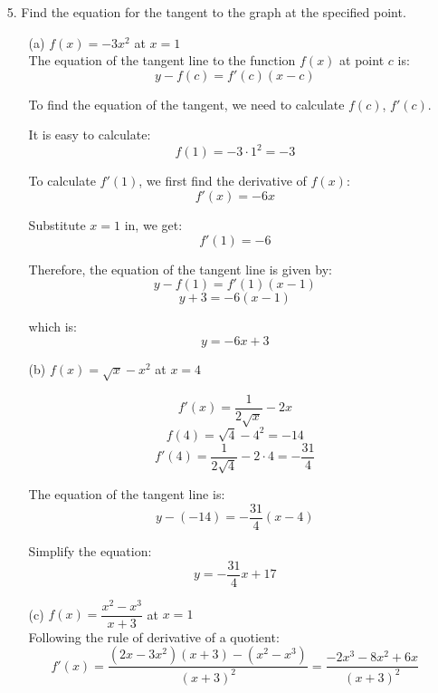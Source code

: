 \documentclass{article}
\begin{document}
\begin{enumerate}

    \item[5.] Find the equation for the tangent to the graph at the specified point.
    
        \begin{enumerate}
            
            \item[(a)] $f(x) = -3x^2$ at $x = 1$ \\
            
            The equation of the tangent line to the function $f(x)$ at point $c$ is: 
            $$ y - f(c) = f'(c)(x - c)$$
                
            To find the equation of the tangent, we need to calculate $f(c)$, $f'(c)$.
            
            It is easy to calculate:
            $$ f(1) = -3 \cdot 1^2 = -3 $$
            
            To calculate $f'(1)$, we first find the derivative of $f(x)$:
            $$ f'(x) = -6x $$
            
            Substitute $x = 1$ in, we get:
            $$ f'(1) = -6 $$
            
            Therefore, the equation of the tangent line is given by:
            $$ y - f(1) = f'(1)(x - 1) $$
            $$ y + 3 = -6(x - 1) $$
            
            which is:
            $$ y = -6x + 3$$
            
            \item[(b)] $f(x) = \sqrt{x} - x^2$ at $x = 4$
            
            $$ f'(x) = \frac{1}{2\sqrt{x}} - 2x $$
            $$ f(4) = \sqrt{4} - 4^2 = -14 $$
            $$ f'(4) = \frac{1}{2\sqrt{4}} - 2 \cdot 4 = -\frac{31}{4} $$
            
            The equation of the tangent line is:
            $$ y - (-14) = -\frac{31}{4}(x - 4) $$
            
            Simplify the equation:
            $$ y = -\frac{31}{4}x + 17 $$
            
            
            \item[(c)] $f(x) = \dfrac{x^2 - x^3}{x + 3}$ at $x = 1$ \\
            
            Following the rule of derivative of a quotient:
            $$ f'(x) = \frac{(2x - 3x^2)(x + 3) - (x^2 - x^3)}{(x + 3)^2} = \frac{-2x^3 - 8x^2 + 6x}{(x + 3)^2} $$
            

\end{enumerate}
\end{enumerate}
\end{document}
